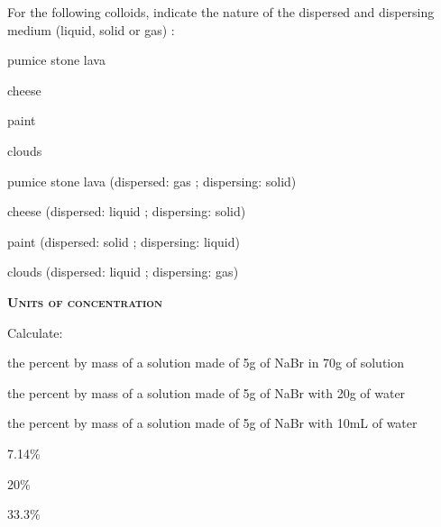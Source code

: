 \documentclass[main.tex]{subfiles}
\begin{document}
\begin{multicols*}{2}
\begin{question}[ID=\the\value{numA}]
For the following colloids, indicate the nature of the dispersed and dispersing medium (liquid, solid or gas) : 
\begin{inparaenum}[(a)]	
\item  pumice stone lava %
\item  cheese  %
\item  paint  %
\item  clouds  %
 \end{inparaenum}
\end{question}
\begin{solution}
\begin{inparaenum}[(a)]
\item  pumice stone lava   (dispersed: gas ; dispersing: solid)
\item  cheese   (dispersed: liquid ; dispersing: solid)
\item  paint   (dispersed: solid ; dispersing: liquid)
\item  clouds   (dispersed: liquid ; dispersing: gas)
 \end{inparaenum}
\hspace{0.1cm}\end{solution}%

{\raggedright\textsc{\textbf{Units of concentration }}\par}




\begin{question}[ID=\the\value{numA}]
Calculate: 
\begin{inparaenum}[(a)]
\item  the percent by mass of a solution made of 5g of NaBr in 70g of solution %
\item  the percent by mass of a solution made of 5g of NaBr with 20g of water%
\item  the percent by mass of a solution made of 5g of NaBr with 10mL of water%
 \end{inparaenum}
\end{question}
\begin{solution}
\begin{inparaenum}[(a)]
\item   7.14\% 
\item   20\% 
\item   33.3\% 
 \end{inparaenum}\hspace{0.1cm}\end{solution}%


\end{multicols*}
\end{document}
